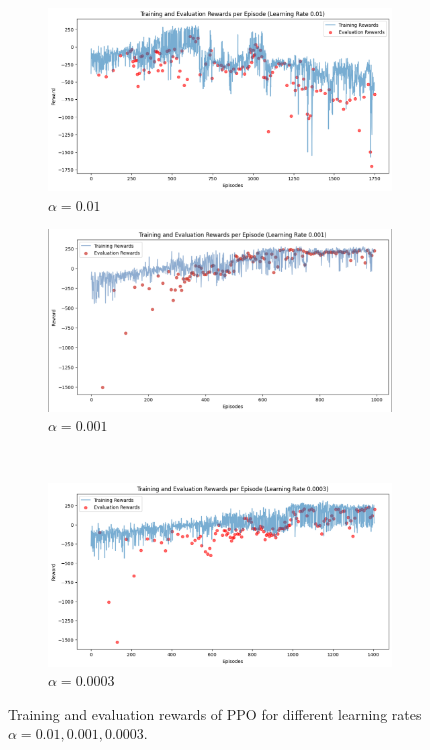 \documentclass[a4paper, 11pt]{article}
\begin{document}
	\begin{figure}[H]
		\begin{center}
			\begin{subfigure}{0.48\textwidth}
				\includegraphics[width=\linewidth]{ppo_figures/lr_results_0.01.png}
				\caption{$\alpha=0.01$}
				\label{fig:ppo_lr0.01}
			\end{subfigure}\hfill 
			\begin{subfigure}{0.48\textwidth}
				\includegraphics[width=\linewidth]{ppo_figures/lr_results_0.001.png}
				\caption{$\alpha=0.001$}
				\label{fig:ppo_lr0.001}
			\end{subfigure}\\
			\begin{subfigure}{0.48\textwidth}
				\includegraphics[width=\linewidth]{ppo_figures/lr_results_0.0003.png}
				\caption{$\alpha=0.0003$}
				\label{fig:ppo_lr0.0003}
			\end{subfigure} 
		\end{center}
		\caption{Training and evaluation rewards of PPO for different learning rates $\alpha=0.01,0.001,0.0003$.}
		\label{fig:ppo_lr}
	\end{figure}
\end{document}
